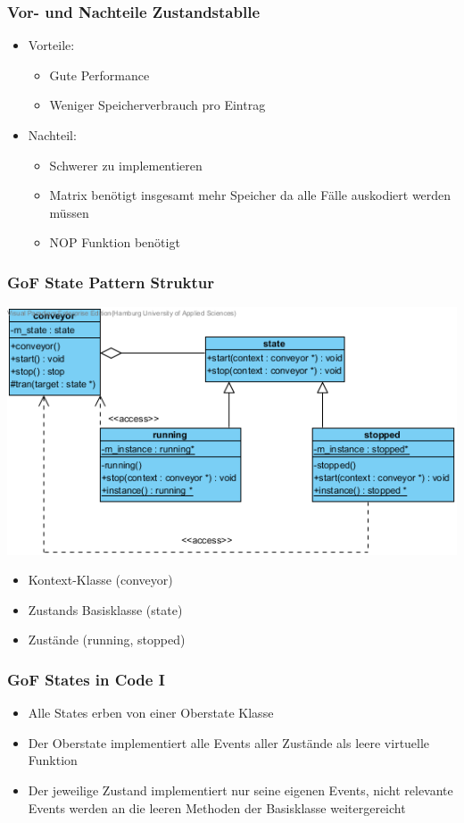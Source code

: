 \documentclass{beamer}
\begin{document}
\begin{frame}
 \frametitle{Vor- und Nachteile Zustandstablle}
 \begin{itemize}
  \item Vorteile:
  \begin{itemize}
   \item Gute Performance
   \item Weniger Speicherverbrauch pro Eintrag
  \end{itemize}
  \item Nachteil:
  \begin{itemize}
   \item Schwerer zu implementieren
   \item Matrix ben\"otigt insgesamt mehr Speicher da alle F\"alle auskodiert werden m\"ussen
   \item NOP Funktion ben\"otigt
  \end{itemize}
 \end{itemize}
\end{frame}

\begin{frame}
 \frametitle{GoF State Pattern Struktur}
 \begin{center}
   \includegraphics[scale=.65]{img/GoF_pure.png}
 \end{center}
 \begin{itemize}
  \item Kontext-Klasse (conveyor)
  \item Zustands Basisklasse (state)
  \item Zust\"ande (running, stopped)
 \end{itemize}
\end{frame}

\begin{frame}
 \frametitle{GoF States in Code I}
 \begin{itemize}
  \item Alle States erben von einer Oberstate Klasse
  \item Der Oberstate implementiert alle Events aller Zust\"ande als leere virtuelle Funktion
  \item Der jeweilige Zustand implementiert nur seine eigenen Events, nicht relevante
  Events werden an die leeren Methoden der Basisklasse weitergereicht
 \end{itemize}
\end{frame}
\end{document}
